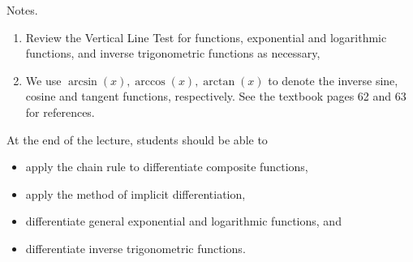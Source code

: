 \documentclass[../main]{subfiles}
\begin{document}
%
%
Notes.
  \begin{enumerate}
    \item Review the Vertical Line Test for functions, exponential and logarithmic functions, and inverse trigonometric functions as necessary,
    \item We use \(\arcsin(x), \arccos(x), \arctan(x)\) to denote the inverse sine, cosine and tangent functions, respectively. See the textbook pages 62 and 63 for references. 
  \end{enumerate}




%
%

  At the end of the lecture, students should be able to
  \begin{itemize}
    \item apply the chain rule to differentiate composite functions,
    \item apply the method of implicit differentiation,
    \item differentiate general exponential and logarithmic functions, and
    \item differentiate inverse trigonometric functions.
  \end{itemize}




%
%
%
\end{document}
